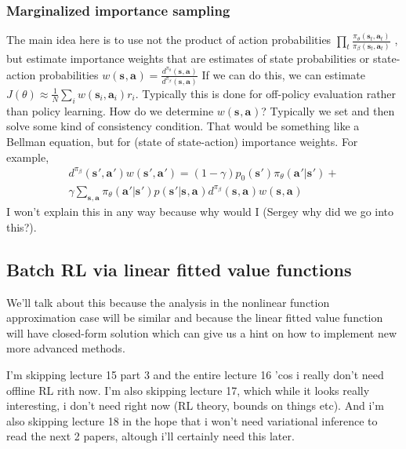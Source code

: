 \documentclass{report}
\begin{document}
\subsubsection{Marginalized importance sampling}
The main idea here is to use not the product of action probabilities $ \prod_{t}^{} \frac{\pi_{ \theta }(\bm{s}_{t}, \bm{a}_{t} )}{\pi_{ \beta }(\bm{s}_{t}, \bm{a}_{t} )}    $ , but estimate importance
weights that are estimates of state probabilities or state-action probabilities 
$ w (\bm{s}_{}, \bm{a}_{} ) = \frac{d^{ \pi_{ \theta } } (\bm{s}_{}, \bm{a}_{} )}{d^{ \pi_{ \beta } }(\bm{s}_{}, \bm{a}_{} )}  $
If we can do this, we can estimate $ J (\theta) \approx \frac{1}{N}  \sum_{i}^{} w (\bm{s}_{i}, \bm{a}_{i} )r_{ i }  $.
Typically this is done for off-policy evaluation rather than policy learning.
How do we determine $ w (\bm{s}_{}, \bm{a}_{} )  $? Typically we set and then solve some kind of consistency condition.
That would be something like a Bellman equation, but for (state of state-action) importance weights.
For example,
\begin{equation}
		\begin{split}
d^{ \pi_{ \beta } } (\bm{s}_{}', \bm{a}_{} ') w (\bm{s}_{}', \bm{a}_{}' ) =
(1 -\gamma ) p_{ 0 } (\bm{s}_{}') \pi_{ \theta } (\bm{a}_{}'| \bm{s}_{} ') +\\
\gamma \sum_{\bm{s}_{}, \bm{a}_{}}^{} \pi_{ \theta } (\bm{a}_{}'| \bm{s}_{}' ) p (\bm{s}_{}'|\bm{s}_{}, \bm{a}_{}) d^{ \pi_{ \beta } }
(\bm{s}_{}, \bm{a}_{} ) w (\bm{s}_{}, \bm{a}_{} )
		\end{split}
\end{equation}
I won't explain this in any way because why would I (Sergey why did we go into this?).

\subsection{Batch RL via linear fitted value functions}
We'll talk about this because the analysis in the nonlinear function approximation case will be similar
and because the linear fitted value function will have closed-form solution which can give us a hint
on how to implement new more advanced methods.

I'm skipping lecture 15 part 3 and the entire lecture 16 'cos i really don't need offline RL rith now.
I'm also skipping lecture 17, which while it looks really interesting, i don't need right now (RL theory, bounds on things etc).
And i'm also skipping lecture 18 in the hope that i won't need variational inference to read the next 2 papers,
altough i'll certainly need this later.
\end{document}
